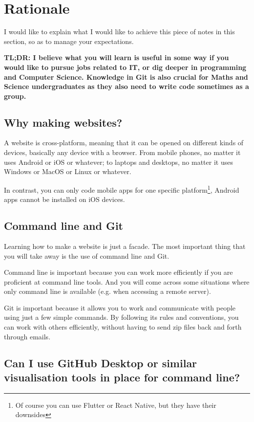 \section{Rationale}

I would like to explain what I would like to achieve this piece of notes in this section, so as to manage your expectations.
\vspace{6mm}

\textbf{TL;DR: I believe what you will learn is useful in some way if you would like to pursue jobs related to IT, or dig deeper in programming and Computer Science. Knowledge in Git is also crucial for Maths and Science undergraduates as they also need to write code sometimes as a group.}

\subsection*{Why making websites?}

A website is cross-platform, meaning that it can be opened on different kinds of devices, basically any device with a browser. From mobile phones, no matter it uses Android or iOS or whatever; to laptops and desktops, no matter it uses Windows or MacOS or Linux or whatever.

In contrast, you can only code mobile apps for one specific platform\footnote{Of course you can use Flutter or React Native, but they have their downsides}, Android apps cannot be installed on iOS devices. 

\subsection*{Command line and Git}

Learning how to make a website is just a facade. The most important thing that you will take away is the use of command line and Git.

Command line is important because you can work more efficiently if you are proficient at command line tools. And you will come across some situations where only command line is available (e.g. when accessing a remote server). 

Git is important because it allows you to work and communicate with people using just a few simple commands. By following its rules and conventions, you can work with others efficiently, without having to send zip files back and forth through emails. 

\subsection*{Can I use GitHub Desktop or similar visualisation tools in place for command line?}

